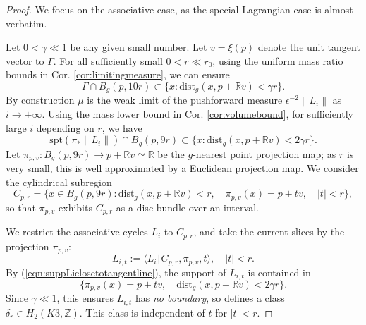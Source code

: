 \documentclass{article}
\theoremstyle{definition}
\newcommand{\R}{\mathbb{R}}
\newcommand{\Z}{\mathbb{Z}}
\newcommand{\norm}[1]{\left\lVert#1\right\rVert}
\begin{document}
		\begin{proof}
			We focus on the associative case, as the special Lagrangian case is almost verbatim.
			
		Let $0<\gamma \ll 1$ be any given small number. Let $v= \xi(p)$ denote the unit tangent vector to $ \Gamma $. For all sufficiently small $0<r\ll r_0$, using the uniform mass ratio bounds in Cor. \ref{cor:limitingmeasure}, we can ensure
		\[
		\Gamma\cap B_g(p, 10r) \subset \{   x: \text{dist}_g(x, p+ \R v) < \gamma r        \}.
		\]
		By construction $\mu$ is the weak limit of the pushforward measure $\epsilon^{-2} \norm{L_i}$ as $i\to +\infty$. Using the mass lower bound in Cor. \ref{cor:volumebound}, for sufficiently large $i$ depending on $r$, we have 
		\begin{equation}\label{eqn:suppLiclosetotangentline}
		\text{spt}( \pi_* \norm{L_i}  ) \cap B_g(p, 9r) \subset \{   x: \text{dist}_g(x, p+ \R v) <2 \gamma r        \}.
		\end{equation}
		Let $\pi_{p,v}: B_g(p, 9r)\to p+ \R v\simeq \R$ be the $g$-nearest point projection map; as $r$ is very small, this is well approximated by a Euclidean projection map. We consider the cylindrical subregion
		\[
		C_{p,r}=\{      x\in B_g(p, 9r): \text{dist}_g(  x, p+\R v  ) < r,  \quad \pi_{p,v}(x)=p+tv, \quad |t|< r        \},
		\]
		so that $\pi_{p,v}$ exhibits $C_{p,r}$ as a disc bundle over an interval. 
		
		
		
		We restrict the associative cycles $L_i$ to $C_{p,r}$, and take the current slices by the projection $\pi_{p,v}$:
		\[
		L_{i,t}:=  \langle L_i \lfloor  C_{p,r},  \pi_{p,v}, t\rangle ,\quad |t|<r.
		\]
		By (\ref{eqn:suppLiclosetotangentline}), the support of $L_{i,t}$ is contained in 
		\[
		\{      \pi_{p,v}(x)=p+ tv, \quad      \text{dist}_g(x, p+ \R v) <2 \gamma r           \}.
		\]
		Since $\gamma\ll 1$, this ensures $L_{i,t}$ has \emph{no boundary}, so defines a class  $\delta_r \in H_2(K3,\Z)$. This class is independent of $t$ for $|t|<r$. 
		
		
		

\end{proof}
\end{document}

